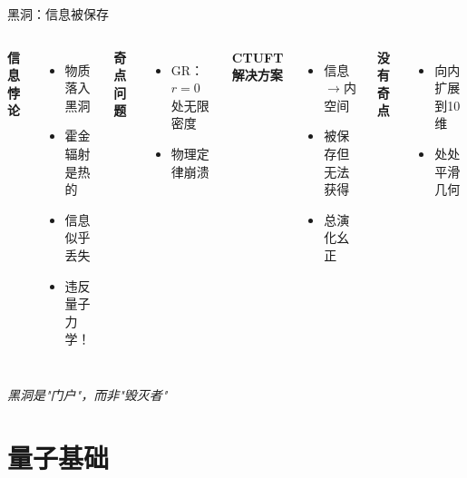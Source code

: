 \documentclass[aspectratio=169]{beamer}
\begin{document}
\begin{frame}{黑洞：信息被保存}
\begin{columns}
\textbf{信息悖论}
\begin{itemize}
    \item 物质落入黑洞
    \item 霍金辐射是热的
    \item 信息似乎丢失
    \item 违反量子力学！
\end{itemize}

\vspace{0.5cm}

\textbf{奇点问题}
\begin{itemize}
    \item GR：$r=0$处无限密度
    \item 物理定律崩溃
\end{itemize}

\textbf{CTUFT解决方案}
\begin{itemize}
    \item 信息$\to$内空间
    \item 被保存但无法获得
    \item 总演化幺正
\end{itemize}

\vspace{0.5cm}

\textbf{没有奇点}
\begin{itemize}
    \item 向内扩展到10维
    \item 处处平滑几何
\end{itemize}
\end{columns}

\vspace{0.5cm}
\begin{center}
\textit{黑洞是"门户"，而非"毁灭者"}
\end{center}
\end{frame}

\section{量子基础}
\end{document}
